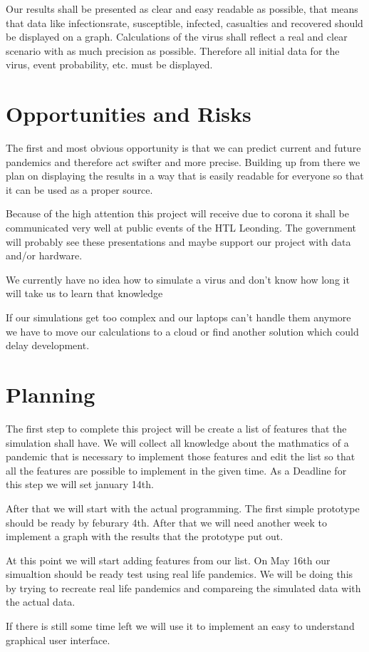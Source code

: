 \documentclass[12pt]{article}
\theoremstyle{definition}
\begin{document}
Our results shall be presented as clear and easy readable as possible, 
that means that data like infectionsrate, susceptible, infected, casualties and recovered should be displayed on a graph.
Calculations of the virus shall reflect a real and clear scenario with as much precision as possible.
Therefore all initial data for the virus, event probability, etc. must be displayed.

\pagebreak
\section{Opportunities and Risks}

The first and most obvious opportunity is that we can predict current and future pandemics and therefore act swifter and more precise.
Building up from there we plan on displaying the results in a way that is easily readable for everyone so that it can be used as a proper source.

Because of the high attention this project will receive due to corona it shall be communicated very well at public events of the HTL Leonding.
The government will probably see these presentations and maybe support our project with data and/or hardware.

We currently have no idea how to simulate a virus and don't know how long it will take us to learn that knowledge

If our simulations get too complex and our laptops can't handle them anymore we have to move our calculations to a cloud or find another solution which could delay development.

\pagebreak
\section{Planning}

The first step to complete this project will be create a list of features that the simulation shall have.
We will collect all knowledge about the mathmatics of a pandemic that is necessary to implement those features and edit the list so that all the features are possible to implement in the given time.
As a Deadline for this step we will set january 14th. 

After that we will start with the actual programming.
The first simple prototype should be ready by feburary 4th. After that we will need another week to implement a graph with the results that the prototype put out.


At this point we will start adding features from our list. On May 16th our simualtion should be ready test using real life pandemics. 
We will be doing this by trying to recreate real life pandemics and compareing the simulated data with the actual data.


If there is still some time left we will use it to implement an easy to understand graphical user interface.
\end{document}
